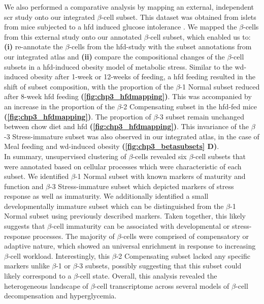 We also performed a comparative analysis by mapping an external, independent \gls{scr} study onto our integrated  $\beta$-cell subset. This dataset was obtained from islets from mice subjected to a \acrfull{hfd} induced glucose intolerance \textbf{\cite{fu_single-cell_2023}}. We mapped the $\beta$-cells from this external study onto our annotated $\beta$-cell subset, which enabled us to: \textbf{(i)} re-annotate the $\beta$-cells from the \gls{hfd}-study with the subset annotations from our integrated atlas and \textbf{(ii)} compare the compositional changes of the $\beta$-cell subsets in a \gls{hfd}-induced obesity model of metabolic stress. Similar to the \gls{wd}-induced obesity after 1-week or 12-weeks of feeding, a \gls{hfd} feeding resulted in the shift of subset composition, with the proportion of the $\beta$-1 Normal subset reduced after 8-week \gls{hfd} feeding \textbf{(\autoref{fig:chp3_hfdmapping})}. This was accompanied by an increase in the proportion of the $\beta$-2 Compensating subset in the \gls{hfd}-fed mice \textbf{(\autoref{fig:chp3_hfdmapping})}. The proportion of $\beta$-3 subset remain unchanged between chow diet  and \gls{hfd} \textbf{(\autoref{fig:chp3_hfdmapping})}. This invariance of the $\beta$-3 Stress-immature subset was also observed in our integrated atlas, in the case of Meal feeding and \gls{wd}-induced obesity \textbf{(\autoref{fig:chp3_betasubsets} D)}.\\


In summary, unsupervised clustering of $\beta$-cells revealed six $\beta$-cell subsets that were annotated based on cellular processes which were characteristic of each subset. We identified $\beta$-1 Normal subset with known markers of maturity and function and $\beta$-3 Stress-immature subset which depicted markers of stress response as well as immaturity. We additionally identified a small developmentally immature subset which can be distinguished from the $\beta$-1 Normal subset using previously described markers. Taken together, this likely suggests that $\beta$-cell immaturity can be associated with developmental or stress-response processes. The majority of $\beta$-cells were comprised of compensatory or adaptive nature, which showed an universal enrichment in response to increasing $\beta$-cell workload. Interestingly, this $\beta$-2 Compensating subset lacked any specific markers unlike $\beta$-1 or $\beta$-3 subsets, possibly suggesting that this subset could likely correspond to a $\beta$-cell state. Overall, this analysis revealed the heterogeneous landscape of $\beta$-cell transcriptome across several models of $\beta$-cell decompensation and hyperglycemia. 

